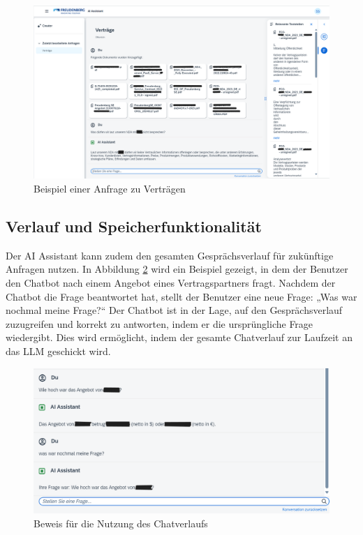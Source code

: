 \begin{figure}[H]
    \centering
    \includegraphics[width=1\textwidth]{img/Chatbot_vertraege_anfrage.png}
    \caption{Beispiel einer Anfrage zu Verträgen}
    \label{fig:chatbot_vertraege_anfrage}
\end{figure}

\subsection{Verlauf und Speicherfunktionalität}

Der AI Assistant kann zudem den gesamten Gesprächsverlauf für zukünftige Anfragen nutzen. In Abbildung \ref{fig:memory_proof} wird ein Beispiel gezeigt, 
in dem der Benutzer den Chatbot nach einem Angebot eines Vertragspartners fragt. Nachdem der Chatbot die Frage beantwortet hat, stellt der Benutzer eine neue Frage: „Was war nochmal meine Frage?“ 
Der Chatbot ist in der Lage, auf den Gesprächsverlauf zuzugreifen und korrekt zu antworten, indem er die ursprüngliche Frage wiedergibt. 
Dies wird ermöglicht, indem der gesamte Chatverlauf zur Laufzeit an das \ac{LLM} geschickt wird.

\begin{figure}[H]
    \centering
    \includegraphics[width=1\textwidth]{img/Chatbot_memory_proof.png}
    \caption{Beweis für die Nutzung des Chatverlaufs}
    \label{fig:memory_proof}
\end{figure}

